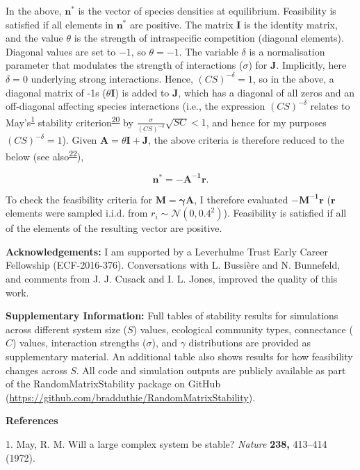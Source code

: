\documentclass[]{article}
\begin{document}
In the above, \(\mathbf{n^{*}}\) is the vector of species densities at
equilibrium. Feasibility is satisfied if all elements in
\(\mathbf{n^{*}}\) are positive. The matrix \(\mathbf{I}\) is the
identity matrix, and the value \(\theta\) is the strength of
intraspecific competition (diagonal elements). Diagonal values are set
to \(-1\), so \(\theta = -1\). The variable \(\delta\) is a
normalisation parameter that modulates the strength of interactions
(\(\sigma\)) for \(\mathbf{J}\). Implicitly, here \(\delta = 0\)
underlying strong interactions. Hence, \((CS)^{-\delta} = 1\), so in the
above, a diagonal matrix of -1s (\(\theta \mathbf{I}\)) is added to
\(\mathbf{J}\), which has a diagonal of all zeros and an off-diagonal
affecting species interactions (i.e., the expression \((CS)^{-\delta}\)
relates to May's\textsuperscript{\protect\hyperlink{ref-May1972}{1}}
stability
criterion\textsuperscript{\protect\hyperlink{ref-Dougoud2018}{20}} by
\(\frac{\sigma}{(CS)^{-\delta}}\sqrt{SC} < 1\), and hence for my
purposes \((CS)^{-\delta} = 1\)). Given
\(\mathbf{A} = \theta\mathbf{I + J}\), the above criteria is therefore
reduced to the below (see
also\textsuperscript{\protect\hyperlink{ref-Servan2018}{22}}),

\[\mathbf{n^{*} = -A^{-1}r}.\]

To check the feasibility criteria for \(\mathbf{M = \gamma A}\), I
therefore evaluated \(\mathbf{-M^{-1}r}\) (\(\mathbf{r}\) elements were
sampled i.i.d. from \(r_{i} \sim \mathcal{N}(0, 0.4^{2})\)). Feasibility
is satisfied if all of the elements of the resulting vector are
positive.

\textbf{Acknowledgements:} I am supported by a Leverhulme Trust Early
Career Fellowship (ECF-2016-376). Conversations with L. Bussière and N.
Bunnefeld, and comments from J. J. Cusack and I. L. Jones, improved the
quality of this work.

\textbf{Supplementary Information:} Full tables of stability results for
simulations across different system size (\(S\)) values, ecological
community types, connectance (\(C\)) values, interaction strengths
(\(\sigma\)), and \(\gamma\) distributions are provided as supplementary
material. An additional table also shows results for how feasibility
changes across \(S\). All code and simulation outputs are publicly
available as part of the RandomMatrixStability package on GitHub
(\url{https://github.com/bradduthie/RandomMatrixStability}).

\textbf{References}

\hypertarget{refs}{}
\hypertarget{ref-May1972}{}
1. May, R. M. Will a large complex system be stable? \emph{Nature}
\textbf{238,} 413--414 (1972).
\end{document}
